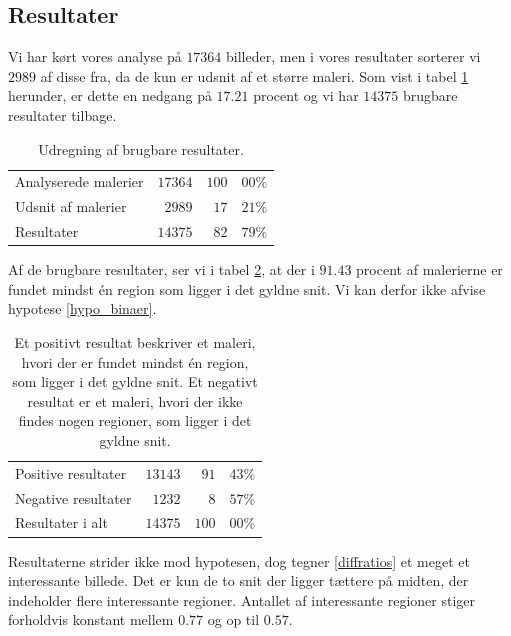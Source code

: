{\subsection{Resultater}
Vi har kørt vores analyse på $17364$ billeder, men i vores resultater
sorterer vi $2989$ af disse fra, da de kun er udsnit af et større maleri.
Som vist i tabel \ref{tabel_fjern_detaljer} herunder, er dette en nedgang
på $17.21$ procent og vi har $14375$ brugbare resultater tilbage.

\begin{table}[!h]
    \centering
    \begin{tabular}{|p{12em}|r|r@{.}l|}
        \hline
        Analyserede malerier & $17364$ & $100$ & $00\%$   \\
        Udsnit af malerier   &  $2989$ &  $17$ & $21\%$   \\\hline
        Resultater           & $14375$ &  $82$ & $79\%$   \\\hline
    \end{tabular}
    \caption[]{Udregning af brugbare resultater.}
    \label{tabel_fjern_detaljer}
\end{table}

Af de brugbare resultater, ser vi i tabel \ref{tabel_fordeling}, at der
i $91.43$ procent af malerierne er fundet mindst én region som ligger i
det gyldne snit. Vi kan derfor ikke afvise hypotese \ref{hypo_binaer}.

\begin{table}[!h]
    \centering
    \begin{tabular}{|p{12em}|r|r@{.}l|}
        \hline
        Positive resultater   & $13143$ &  $91$ & $43\%$ \\
        Negative resultater   &  $1232$ &   $8$ & $57\%$ \\\hline
        Resultater i alt      & $14375$ & $100$ & $00\%$ \\\hline
    \end{tabular}
    \caption[]{Et positivt resultat beskriver et maleri, hvori der er
    fundet mindst én region, som ligger i det gyldne snit. Et negativt
    resultat er et maleri, hvori der ikke findes nogen regioner, som
    ligger i det gyldne snit.}
    \label{tabel_fordeling}
\end{table}

\newpage
Resultaterne strider ikke mod hypotesen, dog tegner \ref{diffratios}
et meget et interessante billede. Det er kun de to snit der ligger
tættere på midten, der indeholder flere interessante regioner.
Antallet af interessante regioner stiger forholdvis konstant mellem
$0.77$ og op til $0.57$.

}
